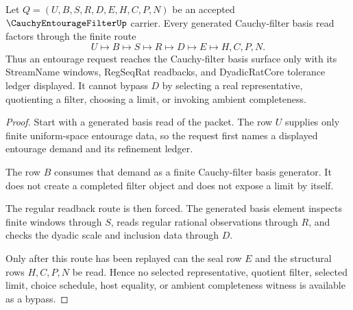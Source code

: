 \begin{theorem}
\label{thm:cauchy-entourage-filter-dyadic-basis-handoff}
Let $Q=(U,B,S,R,D,E,H,C,P,N)$ be an accepted $\CauchyEntourageFilterUp$ carrier. Every generated Cauchy-filter basis read factors through the finite route
$$
U \longmapsto B \longmapsto S \longmapsto R \longmapsto D \longmapsto E \longmapsto H,C,P,N .
$$
Thus an entourage request reaches the Cauchy-filter basis surface only with its StreamName windows, RegSeqRat readbacks, and DyadicRatCore tolerance ledger displayed. It cannot bypass $D$ by selecting a real representative, quotienting a filter, choosing a limit, or invoking ambient completeness.
\end{theorem}
\begin{proof}
Start with a generated basis read of the packet. The row $U$ supplies only finite uniform-space entourage data, so the request first names a displayed entourage demand and its refinement ledger.

The row $B$ consumes that demand as a finite Cauchy-filter basis generator. It does not create a completed filter object and does not expose a limit by itself.

The regular readback route is then forced. The generated basis element inspects finite windows through $S$, reads regular rational observations through $R$, and checks the dyadic scale and inclusion data through $D$.

Only after this route has been replayed can the seal row $E$ and the structural rows $H,C,P,N$ be read. Hence no selected representative, quotient filter, selected limit, choice schedule, host equality, or ambient completeness witness is available as a bypass.
\end{proof}

